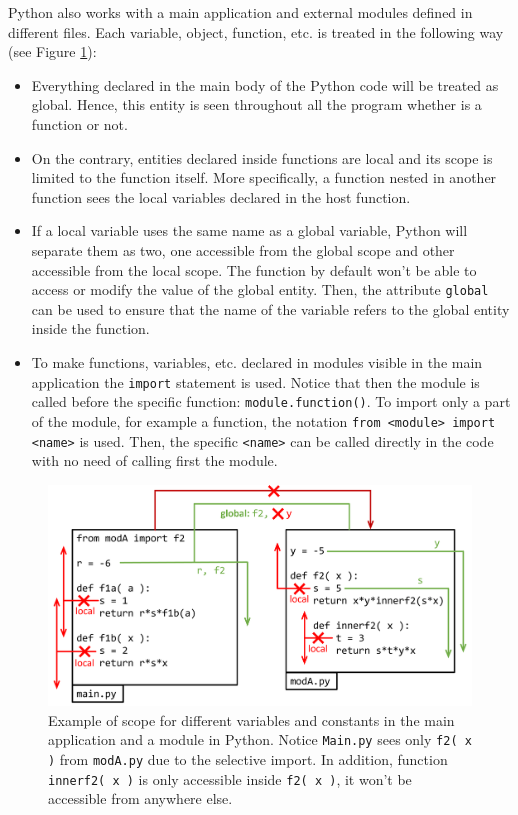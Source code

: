 Python also works with a main application and external modules defined in different files. 
Each variable, object, function, etc. is treated in the following way (see Figure \ref{fig:ScopePy}):
\begin{itemize}
    \item Everything declared in the main body of the Python code will be treated as global. 
    Hence, this entity is seen throughout all the program whether is a function or not.
    
    \item On the contrary, entities declared inside functions are local and its scope is limited to the function itself. 
    More specifically, a function nested in another function sees the local variables declared in the host function.
    
    \item If a local variable uses the same name as a global variable, Python will separate them as two, one accessible from the global scope and other accessible from the local scope. 
    The function by default won't be able to access or modify the value of the global entity.
    Then, the attribute \texttt{global} can be used to ensure that the name of the variable refers to the global entity inside the function.
    
    \item To make functions, variables, etc. declared in modules visible in the main application the \texttt{import} statement is used. 
    Notice that then the module is called before the specific function: \texttt{module.function()}.
    To import only a part of the module, for example a function, the notation \texttt{from <module> import <name>} is used. 
    Then, the specific \texttt{<name>} can be called directly in the code with no need of calling first the module.
\end{itemize}

\begin{figure}[h]
    \centering
    \includegraphics[width= \textwidth]{./doc/Figures/ScopePy.png}
    \caption{Example of scope for different variables and constants in the main application and a module in Python. Notice \texttt{Main.py} sees only \texttt{f2( x )} from \texttt{modA.py} due to the selective import. In addition, function \texttt{innerf2( x )} is only accessible inside \texttt{f2( x )}, it won't be accessible from anywhere else.}
    \label{fig:ScopePy}
\end{figure}



